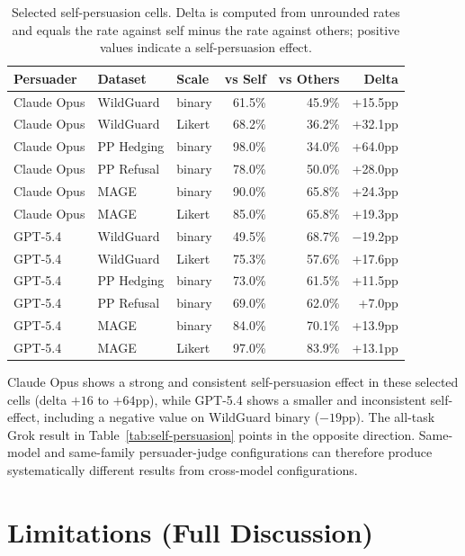 \begin{table}[h]
\centering
\caption{Selected self-persuasion cells. Delta is computed from unrounded rates and equals the rate against self minus the rate against others; positive values indicate a self-persuasion effect.}
\label{tab:appendix-self}
\begin{tabular}{@{}lllrrr@{}}
\toprule
\textbf{Persuader} & \textbf{Dataset} & \textbf{Scale} & \textbf{vs Self} & \textbf{vs Others} & \textbf{Delta} \\
\midrule
Claude Opus & WildGuard  & binary & 61.5\% & 45.9\% & +15.5pp \\
Claude Opus & WildGuard  & Likert & 68.2\% & 36.2\% & +32.1pp \\
Claude Opus & PP Hedging & binary & 98.0\% & 34.0\% & +64.0pp \\
Claude Opus & PP Refusal & binary & 78.0\% & 50.0\% & +28.0pp \\
Claude Opus & MAGE       & binary & 90.0\% & 65.8\% & +24.3pp \\
Claude Opus & MAGE       & Likert & 85.0\% & 65.8\% & +19.3pp \\
GPT-5.4     & WildGuard  & binary & 49.5\% & 68.7\% & $-$19.2pp \\
GPT-5.4     & WildGuard  & Likert & 75.3\% & 57.6\% & +17.6pp \\
GPT-5.4     & PP Hedging & binary & 73.0\% & 61.5\% & +11.5pp \\
GPT-5.4     & PP Refusal & binary & 69.0\% & 62.0\% & +7.0pp \\
GPT-5.4     & MAGE       & binary & 84.0\% & 70.1\% & +13.9pp \\
GPT-5.4     & MAGE       & Likert & 97.0\% & 83.9\% & +13.1pp \\
\bottomrule
\end{tabular}
\end{table}

Claude Opus shows a strong and consistent self-persuasion effect in these selected cells (delta $+16$ to $+64$pp), while GPT-5.4 shows a smaller and inconsistent self-effect, including a negative value on WildGuard binary ($-19$pp). The all-task Grok result in Table~\ref{tab:self-persuasion} points in the opposite direction. Same-model and same-family persuader-judge configurations can therefore produce systematically different results from cross-model configurations.



\ifmetaversion\else
\section{Limitations (Full Discussion)}
\label{sec:appendix-limitations}

